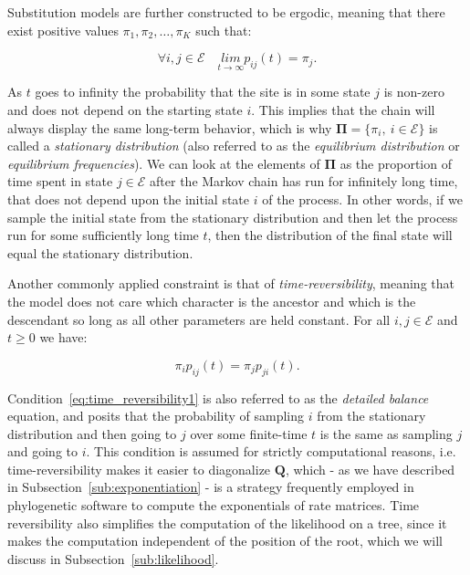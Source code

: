 Substitution models are further constructed to be ergodic, meaning that there exist positive values $\pi_{1},\pi_{2},\ldots,\pi_{K}$ such that:

\begin{equation}
\forall i,j\in \mathcal{E}  \quad\underset{t\rightarrow\infty}{lim}p_{ij}(t)=\pi_{j}.
\label{eq:ergodicity}
\end{equation}


As $t$ goes to infinity the probability that the site is in some state $j$ is non-zero and does not depend on the starting state $i$.
This implies that the chain will always display the same long-term behavior, which is why $\mathbf{\Pi}=\{\pi_{i},\ i\in\mathcal{E}\}$ is called a \emph{stationary distribution} (also referred to as the \emph{equilibrium distribution} or \emph{equilibrium frequencies}).
We can look at the elements of $\mathbf{\Pi}$ as the proportion of time spent in state $j\in\mathcal{E}$ after the Markov chain has run for infinitely long time, that does not depend upon the initial state $i$ of the process.
In other words, if we sample the initial state from the stationary distribution and then let the process run for some sufficiently long time $t$, then the distribution of the final state will equal the stationary distribution. 

Another commonly applied constraint is that of \emph{time-reversibility}, meaning that the model does not care which character is the ancestor and which is the descendant so long as all other parameters are held constant.
For all $i,j\in \mathcal{E}$ and $t\geq 0$ we have:

\begin{equation}
\pi_{i}p_{ij}(t)=\pi_{j}p_{ji}(t).
\label{eq:time_reversibility1}
\end{equation}

\noindent
Condition~\ref{eq:time_reversibility1} is also referred to as the \emph{detailed balance} equation, and posits that the probability of sampling $i$ from the stationary distribution and then going to $j$ over some finite-time $t$ is the same as sampling $j$ and going to $i$. 
% 
% 
This condition is assumed for strictly computational reasons, i.e. time-reversibility makes it easier to diagonalize $\mathbf{Q}$, which - as we have described in 
Subsection~\ref{sub:exponentiation} - is a strategy frequently employed in phylogenetic software to compute the exponentials of rate matrices.
Time reversibility also simplifies the computation of the likelihood on a tree, since it makes the computation independent of the position of the root, which we will discuss in Subsection~\ref{sub:likelihood}.


